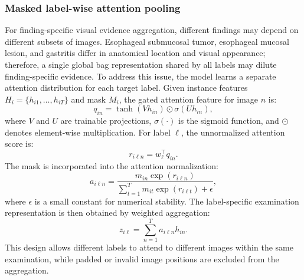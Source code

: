 \documentclass[Afour,sagev,times]{sagej}
\begin{document}
\subsubsection{Masked label-wise attention pooling}
For finding-specific visual evidence aggregation, different findings may depend on different subsets of images. Esophageal submucosal tumor, esophageal mucosal lesion, and gastritis differ in anatomical location and visual appearance; therefore, a single global bag representation shared by all labels may dilute finding-specific evidence. To address this issue, the model learns a separate attention distribution for each target label. Given instance features $H_i=\{h_{i1},\ldots,h_{iT}\}$ and mask $M_i$, the gated attention feature for image $n$ is:
\begin{equation}
q_{in}=\tanh(Vh_{in})\odot\sigma(Uh_{in}),
\end{equation}
where $V$ and $U$ are trainable projections, $\sigma(\cdot)$ is the sigmoid function, and $\odot$ denotes element-wise multiplication. For label $\ell$, the unnormalized attention score is:
\begin{equation}
r_{i\ell n}=w_{\ell}^{\top}q_{in}.
\end{equation}
The mask is incorporated into the attention normalization:
\begin{equation}
a_{i\ell n}=\frac{m_{in}\exp(r_{i\ell n})}{\sum_{t=1}^{T}m_{it}\exp(r_{i\ell t})+\epsilon},
\end{equation}
where $\epsilon$ is a small constant for numerical stability. The label-specific examination representation is then obtained by weighted aggregation:
\begin{equation}
z_{i\ell}=\sum_{n=1}^{T}a_{i\ell n}h_{in}.
\end{equation}
This design allows different labels to attend to different images within the same examination, while padded or invalid image positions are excluded from the aggregation.
\end{document}
